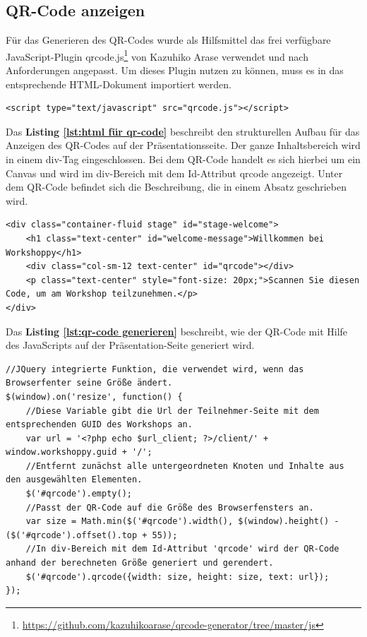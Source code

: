 \newpage
\subsection{QR-Code anzeigen}
\label{subsec:QR-Code anzeigen}
Für das Generieren des QR-Codes wurde als Hilfsmittel das frei verfügbare JavaScript-Plugin qrcode.js\footnote{\url{https://github.com/kazuhikoarase/qrcode-generator/tree/master/js}} von Kazuhiko Arase verwendet und nach Anforderungen angepasst. Um dieses Plugin nutzen zu können, muss es in das entsprechende HTML-Dokument importiert werden.\bigskip

\begin{lstlisting}[caption={Importiere das verwendeten JavaScript-Pluing für das Generieren des QR-Codes}, label=lst:plugin, captionpos=b]
<script type="text/javascript" src="qrcode.js"></script>
\end{lstlisting}
\bigskip

Das \textbf{Listing \ref{lst:html für qr-code}} beschreibt den strukturellen Aufbau für das Anzeigen des QR-Codes auf der Präsentationsseite. Der ganze Inhaltsbereich wird in einem div-Tag eingeschlossen. Bei dem QR-Code handelt es sich hierbei um ein Canvas und wird im div-Bereich mit dem Id-Attribut \glqq qrcode\grqq{} angezeigt. Unter dem QR-Code befindet sich die Beschreibung, die in einem Absatz geschrieben wird.\bigskip

\begin{lstlisting}[caption={HTML-Struktur für das Anzeigen des QR-Codes}, label=lst:html für qr-code, captionpos=b]
<div class="container-fluid stage" id="stage-welcome">
	<h1 class="text-center" id="welcome-message">Willkommen bei Workshoppy</h1>
	<div class="col-sm-12 text-center" id="qrcode"></div>
	<p class="text-center" style="font-size: 20px;">Scannen Sie diesen Code, um am Workshop teilzunehmen.</p>
</div>
\end{lstlisting}
\bigskip

Das \textbf{Listing \ref{lst:qr-code generieren}} beschreibt, wie der QR-Code mit Hilfe des JavaScripts auf der Präsentation-Seite generiert wird.\bigskip
\begin{lstlisting}[caption={Generieren des QR-Codes - JavaScript}, label=lst:qr-code generieren, captionpos=b]
//JQuery integrierte Funktion, die verwendet wird, wenn das Browserfenter seine Größe ändert.
$(window).on('resize', function() {
	//Diese Variable gibt die Url der Teilnehmer-Seite mit dem entsprechenden GUID des Workshops an.
	var url = '<?php echo $url_client; ?>/client/' + window.workshoppy.guid + '/';
	//Entfernt zunächst alle untergeordneten Knoten und Inhalte aus den ausgewählten Elementen.
	$('#qrcode').empty();
	//Passt der QR-Code auf die Größe des Browserfensters an.
	var size = Math.min($('#qrcode').width(), $(window).height() - ($('#qrcode').offset().top + 55));
	//In div-Bereich mit dem Id-Attribut 'qrcode' wird der QR-Code anhand der berechneten Größe generiert und gerendert.
	$('#qrcode').qrcode({width: size, height: size, text: url});
});
\end{lstlisting}

